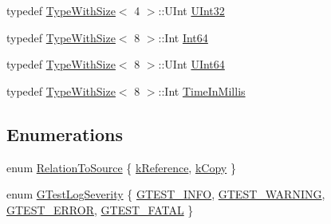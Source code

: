 \begin{DoxyCompactItemize}
\item 
typedef \hyperlink{classtesting_1_1internal_1_1_type_with_size}{Type\+With\+Size}$<$ 4 $>$\+::U\+Int \hyperlink{namespacetesting_1_1internal_a40d4fffcd2bf56f18b1c380615aa85e3}{U\+Int32}
\item 
typedef \hyperlink{classtesting_1_1internal_1_1_type_with_size}{Type\+With\+Size}$<$ 8 $>$\+::Int \hyperlink{namespacetesting_1_1internal_a271c563fec38b804ddab0677f51f70a8}{Int64}
\item 
typedef \hyperlink{classtesting_1_1internal_1_1_type_with_size}{Type\+With\+Size}$<$ 8 $>$\+::U\+Int \hyperlink{namespacetesting_1_1internal_aa6a1ac454e6d7e550fa4925c62c35caa}{U\+Int64}
\item 
typedef \hyperlink{classtesting_1_1internal_1_1_type_with_size}{Type\+With\+Size}$<$ 8 $>$\+::Int \hyperlink{namespacetesting_1_1internal_a66a845df404b38fe85c5e14a069f255a}{Time\+In\+Millis}
\end{DoxyCompactItemize}
\subsection*{Enumerations}
\begin{DoxyCompactItemize}
\item 
enum \hyperlink{namespacetesting_1_1internal_aec4f0eeb60b6b8af8dcf979578bbf3bb}{Relation\+To\+Source} \{ \hyperlink{namespacetesting_1_1internal_aec4f0eeb60b6b8af8dcf979578bbf3bba75535e620e7496a433bf008ea81358a1}{k\+Reference}, 
\hyperlink{namespacetesting_1_1internal_aec4f0eeb60b6b8af8dcf979578bbf3bba272b78aee8068aa2392dbdcf69dfe3a4}{k\+Copy}
 \}
\item 
enum \hyperlink{namespacetesting_1_1internal_aa6255ef3b023c5b4e1a2198d887fb977}{G\+Test\+Log\+Severity} \{ \hyperlink{namespacetesting_1_1internal_aa6255ef3b023c5b4e1a2198d887fb977aff315e0913fcda86fe4de882bf5e33e9}{G\+T\+E\+S\+T\+\_\+\+I\+N\+F\+O}, 
\hyperlink{namespacetesting_1_1internal_aa6255ef3b023c5b4e1a2198d887fb977a7a051bc2794f15a4bf0eab40562a304c}{G\+T\+E\+S\+T\+\_\+\+W\+A\+R\+N\+I\+N\+G}, 
\hyperlink{namespacetesting_1_1internal_aa6255ef3b023c5b4e1a2198d887fb977a651e9cd2a904e0c8210536271b875f75}{G\+T\+E\+S\+T\+\_\+\+E\+R\+R\+O\+R}, 
\hyperlink{namespacetesting_1_1internal_aa6255ef3b023c5b4e1a2198d887fb977a75063567740f6bf7da419b1b9197b12e}{G\+T\+E\+S\+T\+\_\+\+F\+A\+T\+A\+L}
 \}
\end{DoxyCompactItemize}

